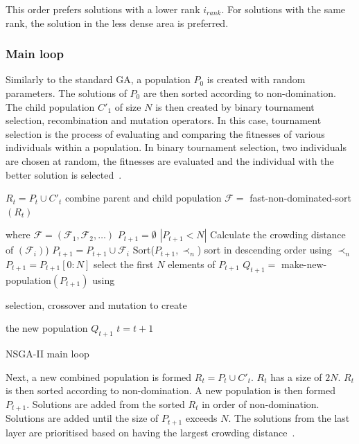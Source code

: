 \documentclass[sigconf]{acmart}
\begin{document}
This order prefers solutions with a lower rank $i_{rank}$. For solutions with the same rank, the solution in the less dense area is preferred.

\subsubsection{Main loop}

Similarly to the standard GA, a population $P_{0}$ is created with random parameters. The solutions of $P_0$ are then sorted according to non-domination. The child population $C'_{1}$ of size $N$ is then created by binary tournament selection, recombination and mutation operators. In this case, tournament selection is the process of evaluating and comparing the fitnesses of various individuals within a population. In binary tournament selection, two individuals are chosen at random, the fitnesses are evaluated and the individual with the better solution is selected~\cite{AbdRahman2016}. 



\begin{algorithm}[b]
\begin{algorithmic}[1]
\State $R_t=P_t \cup C'_t$ combine parent and child population
\State $\mathcal{F} = $ fast-non-dominated-sort $(R_t)$ 

where $\mathcal{F}=(\mathcal{F}_1, \mathcal{F}_2,\ldots)$
\State $P_{t+1}=\emptyset$
\While $\left|P_{t+1}<N\right|$
\State Calculate the crowding distance of $(\mathcal{F}_i)$)
\State $P_{t+1}=P_{t+1}\cup \mathcal{F}_i$
\EndWhile
\State Sort($P_{t+1}, \prec_n$) sort in descending order using $\prec_n$
\State $P_{t+1} = P_{t+1}[0:N]$ select the first $N$ elements of $P_{t+1}$
\State $Q_{t+1} = $ make-new-population$(P_{t+1})$ using 

selection, crossover and mutation to create 

the new population $Q_{t+1}$
\State $t=t+1$
\caption{NSGA-II main loop \cite{Valkanas2014}}
\label{algo:nsga2}
\end{algorithmic}
\end{algorithm}


Next, a new combined population is formed $R_{t}=P_{t} \cup C'_{t}$. $R_t$ has a size of $2N$. $R_t$ is then sorted according to non-domination. A new population is then formed $P_{t+1}$. Solutions are added from the sorted $R_t$ in order of non-domination. Solutions are added until the size of $P_{t+1}$ exceeds $N$. The solutions from the last layer are prioritised based on having the largest crowding distance~\cite{Valkanas2014}.
\end{document}
